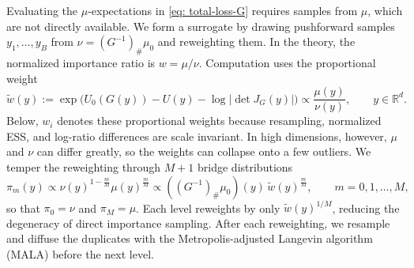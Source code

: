 \documentclass{article}
\begin{document}
Evaluating the $\mu$-expectations in \eqref{eq: total-loss-G} requires samples from $\mu$, which are not directly available. We form a surrogate by drawing pushforward samples $y_1,\dots,y_B$ from $\nu=(G^{-1})_{\#}\mu_0$ and reweighting them. In the theory, the normalized importance ratio is $w=\mu/\nu$. Computation uses the proportional weight
\begin{equation}
    \widetilde w(y)
    := \exp\Big( U_0(G(y)) - U(y) - \log|\det J_G(y)| \Big)
    \propto \frac{\mu(y)}{\nu(y)},
    \qquad y \in \mathbb R^d.
    \label{eq: weight}
\end{equation}
Below, $w_i$ denotes these proportional weights because resampling, normalized ESS, and log-ratio differences are scale invariant. In high dimensions, however, $\mu$ and $\nu$ can differ greatly, so the weights can collapse onto a few outliers. We temper the reweighting through $M+1$ bridge distributions
\begin{equation}
    \pi_m(y) \propto \nu(y)^{1-\frac{m}{M}} \mu(y)^{\frac{m}{M}} \propto ((G^{-1})_{\#}\mu_0)(y)\, \widetilde w(y)^{\frac{m}{M}}, \qquad m = 0,1,\dots,M,
    \label{eq: pi-m}
\end{equation}
so that $\pi_0 = \nu$ and $\pi_M = \mu$. Each level reweights by only $\widetilde w(y)^{1/M}$, reducing the degeneracy of direct importance sampling.
After each reweighting, we resample and diffuse the duplicates with the Metropolis-adjusted Langevin algorithm (MALA) \citep{roberts1996exponential} before the next level.
\end{document}

